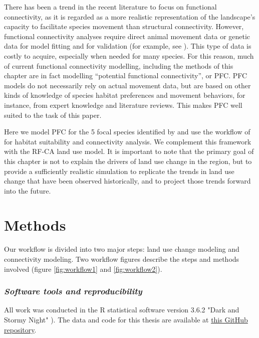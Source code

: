 There has been a trend in the recent literature to focus on functional connectivity, as it is regarded as a more realistic representation of  the landscape’s capacity to facilitate species movement than structural connectivity. However, functional connectivity analyses require direct animal movement data or genetic data for model fitting and for validation (for example, see \cite{beyer_functional_2013, milanesi_three-dimensional_2017}). This type of data is costly to acquire, especially when needed for many species. For this reason, much of current functional connectivity modelling, including the methods of this chapter are in fact modelling “potential functional connectivity”, or PFC. PFC models do not necessarily rely on actual movement data, but are based on other kinds of knowledge of species habitat preferences and movement behaviors, for instance, from expert knowledge and literature reviews. This makes PFC well suited to the task of this paper.

Here we model  PFC for the 5 focal species identified by  \cite{meurant_selecting_2018} and use the workflow of \citep{rayfield_priorisation_2018} for habitat suitability and connectivity analysis. We complement this framework with the RF-CA land use model. It is important to note that the primary goal of this chapter is not to explain the drivers of land use change in the region, but to provide a sufficiently realistic simulation to replicate the trends in land use change that have been observed historically, and to project those trends forward into the future.  \\

\section{Methods}

Our workflow is divided into two major steps: land use change modeling and connectivity modeling. Two workflow figures describe the steps and methods involved (figure \ref{fig:workflow1} and \ref{fig:workflow2}). \\

\subsubsection*{\textit{Software tools and reproducibility}}

All work was conducted in the R statistical software version 3.6.2 "Dark and Stormy Night" \citep[see][]{R}). The data and code for this thesis are available at \href{https://github.com/VLucet/landchange-connectivity-monteregie}{this GitHub repository}.

